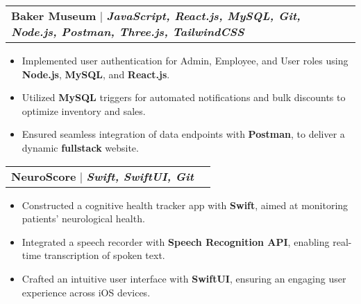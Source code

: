 \documentclass[letterpaper,11pt]{article}
\makeatletter
\newcommand{\resumeItem}[1]{
  \item\small{
    {#1 \vspace{-2pt}}
  }
}
\newcommand{\resumeProjectHeading}[2]{
    \item
    \begin{tabular*}{0.97\textwidth}{l@{\extracolsep{\fill}}r}
      \small#1 & #2 \\
    \end{tabular*}\vspace{-7pt}
}
\newcommand{\resumeItemListStart}{\begin{itemize}}
\newcommand{\resumeItemListEnd}{\end{itemize}\vspace{-5pt}}
\makeatother
\begin{document}
\resumeProjectHeading
    {\textbf{Baker Museum} $|$ \emph{\textbf{JavaScript, React.js, MySQL, Git, Node.js, Postman, Three.js, TailwindCSS}}}{}
    \resumeItemListStart
        \resumeItem{Implemented user authentication for Admin, Employee, and User roles using \textbf{Node.js}, \textbf{MySQL}, and \textbf{React.js}.}
        \resumeItem{Utilized \textbf{MySQL} triggers for automated notifications and bulk discounts to optimize inventory and sales.}
\resumeItem{Ensured seamless integration of data endpoints with \textbf{Postman}, to deliver a dynamic \textbf{fullstack} website.}
    \resumeItemListEnd


\resumeProjectHeading
    {\textbf{NeuroScore} $|$ \emph{\textbf{Swift, SwiftUI, Git}}}{}
    \resumeItemListStart
        \resumeItem{Constructed a cognitive health tracker app with \textbf{Swift}, aimed at monitoring patients' neurological health.}
        \resumeItem{Integrated a speech recorder with \textbf{Speech Recognition API}, enabling real-time transcription of spoken text.}
        \resumeItem{Crafted an intuitive user interface with \textbf{SwiftUI}, ensuring an engaging user experience across iOS devices.}
    \resumeItemListEnd



    
\end{document}
